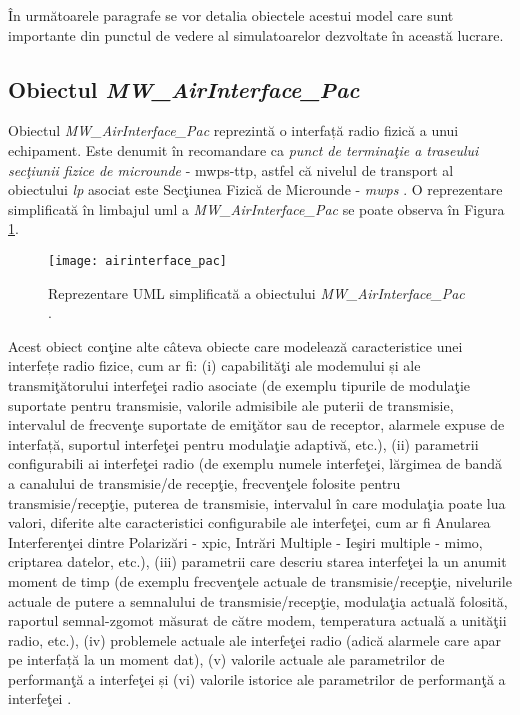 În următoarele paragrafe se vor detalia obiectele acestui model care sunt importante din punctul de vedere al simulatoarelor dezvoltate în această lucrare.

\subsection{Obiectul \textit{MW\_AirInterface\_Pac}}

Obiectul \textit{MW\_AirInterface\_Pac} reprezintă o interfață radio fizică a unui echipament. Este denumit în recomandare ca \textit{punct de terminaţie a traseului secţiunii fizice de microunde} - \gls{mwps-ttp}, astfel că nivelul de transport al obiectului \textit{\gls{lp}} asociat este Secţiunea Fizică de Microunde - \textit{\gls{mwps}} \cite{onftr532}. O reprezentare simplificată în limbajul \gls{uml} a \textit{MW\_AirInterface\_Pac} se poate observa în Figura \ref{fig:airinterface_pac}.

\begin{figure}[h]
	\centering
	\texttt{[image: airinterface\_pac]}
	\caption{Reprezentare UML simplificată a obiectului \textit{MW\_AirInterface\_Pac} \cite{onftr532}.}
	\label{fig:airinterface_pac}
\end{figure}

Acest obiect conţine alte câteva obiecte care modelează caracteristice unei interfețe radio fizice, cum ar fi: (i) capabilităţi ale modemului și ale transmiţătorului interfeţei radio asociate (de exemplu tipurile de modulaţie suportate pentru transmisie, valorile admisibile ale puterii de transmisie, intervalul de frecvenţe suportate de emiţător sau de receptor, alarmele expuse de interfață, suportul interfeţei pentru modulaţie adaptivă, etc.), (ii) parametrii configurabili ai interfeţei radio (de exemplu numele interfeţei, lărgimea de bandă a canalului de transmisie/de recepţie, frecvenţele folosite pentru transmisie/recepţie, puterea de transmisie, intervalul în care modulaţia poate lua valori, diferite alte caracteristici configurabile ale interfeţei, cum ar fi Anularea Interferenţei dintre Polarizări - \gls{xpic}, Intrări Multiple - Ieşiri multiple - \gls{mimo}, criptarea datelor, etc.), (iii) parametrii care descriu starea interfeţei la un anumit moment de timp (de exemplu frecvenţele actuale de transmisie/recepţie, nivelurile actuale de putere a semnalului de transmisie/recepţie, modulaţia actuală folosită, raportul semnal-zgomot măsurat de către modem, temperatura actuală a unităţii radio, etc.), (iv) problemele actuale ale interfeţei radio (adică alarmele care apar pe interfață la un moment dat), (v) valorile actuale ale parametrilor de performanţă a interfeţei și (vi) valorile istorice ale parametrilor de performanţă a interfeţei \cite{onftr532}.

